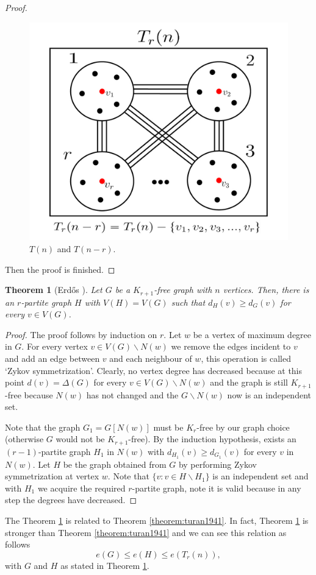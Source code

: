 \documentclass[12pt,twoside,a4paper,bibliography=totocnumbered]{book}
\numberwithin{equation}{section}
\let\setminus=\smallsetminus
\newtheorem{theorem}             {Theorem}[section]
\theoremstyle{remark}
\begin{document}
\begin{proof}
 \begin{figure}[H]
     \centering
     \includegraphics[scale=1]{Figuras/t(n)-and-t(n-r)}
     \caption{$T(n)$ and $T(n-r)$.}
     \label{fig:t(n)-and-t(n-r)}
\end{figure}
Then the proof is finished.
\end{proof}

\begin{theorem}[{Erd\H{o}s \cite{Er70}}]\label{theorem:erdos1970} Let $G$ be a $ K_{r+1}$-free graph with $n$ vertices. Then, there is an $ r$-partite graph $H$ with $V(H) = V(G)$ such that $d_H(v) \geq d_G(v)$ for every $v \in V(G)$.\\
\end{theorem}

\begin{proof}
The proof follows by induction on $r$. Let $w$ be a vertex of maximum degree in $G$. For every vertex $v \in V(G)\setminus N(w)$ we remove the edges incident to $v$ and add an edge between $v$ and each neighbour of $w$, this operation is called `Zykov symmetrization'. Clearly, no vertex degree has decreased because at this point $d(v) = \Delta(G)$ for every $v \in V(G)\setminus N(w)$ and the graph is still $K_{r+1}$-free because $N(w)$ has not changed and the $G\setminus N(w)$ now is an independent set.

Note that the graph $G_1=G[N(w)]$ must be $K_r$-free by our graph choice (otherwise $G$ would not be $K_{r+1}$-free). By the induction hypothesis, exists an $(r-1)$-partite graph $H_1$ in $N(w)$ with $d_{H_1}(v) \geq d_{G_1}(v)$ for every $v$ in $N(w)$. Let $H$ be the graph obtained from $G$ by performing Zykov symmetrization at vertex $w$. Note that $\{v: v \in H\setminus H_1\}$ is an independent set and with $H_1$ we acquire the required $r$-partite graph, note it is valid because in any step the degrees have decreased.
\end{proof}
The Theorem \ref{theorem:erdos1970} is related to Theorem \ref{theorem:turan1941}. In fact, Theorem \ref{theorem:erdos1970} is stronger than Theorem \ref{theorem:turan1941} and we can see this relation as follows $$e(G) \leq e(H) \leq e(T_r(n)),$$
with $G$ and $H$ as stated in Theorem \ref{theorem:erdos1970}.
\end{document}

